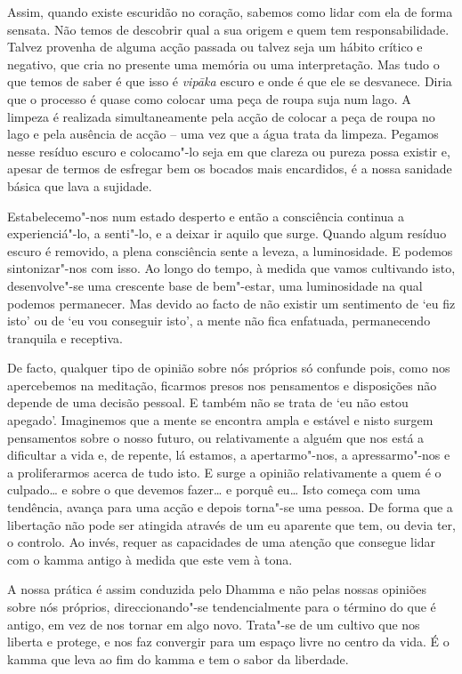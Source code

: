 Assim, quando existe escuridão no coração, sabemos como lidar com ela de forma
sensata. Não temos de descobrir qual a sua origem e quem tem responsabilidade.
Talvez provenha de alguma acção passada ou talvez seja um hábito crítico e
negativo, que cria no presente uma memória ou uma interpretação. Mas tudo o que
temos de saber é que isso é \emph{vipāka} escuro e onde é que ele se desvanece.
Diria que o processo é quase como colocar uma peça de roupa suja num lago. A
limpeza é realizada simultaneamente pela acção de colocar a peça de roupa no
lago e pela ausência de acção -- uma vez que a água trata da limpeza. Pegamos
nesse resíduo escuro e colocamo"-lo seja em que clareza ou pureza possa existir
e, apesar de termos de esfregar bem os bocados mais encardidos, é a nossa
sanidade básica que lava a sujidade.

Estabelecemo"-nos num estado desperto e então a consciência continua a
experienciá"-lo, a senti"-lo, e a deixar ir aquilo que surge. Quando algum resíduo
escuro é removido, a plena consciência sente a leveza, a luminosidade. E podemos
sintonizar"-nos com isso. Ao longo do tempo, à medida que vamos cultivando isto,
desenvolve"-se uma crescente base de bem"-estar, uma luminosidade na qual podemos
permanecer. Mas devido ao facto de não existir um sentimento de `eu fiz isto' ou
de `eu vou conseguir isto', a mente não fica enfatuada, permanecendo tranquila e
receptiva.

\enlargethispage{\baselineskip}

De facto, qualquer tipo de opinião sobre nós próprios só confunde pois, como nos
apercebemos na meditação, ficarmos presos nos pensamentos e disposições não
depende de uma decisão pessoal. E também não se trata de `eu não estou apegado'.
Imaginemos que a mente se encontra ampla e estável e nisto surgem pensamentos
sobre o nosso futuro, ou relativamente a alguém que nos está a dificultar a vida
e, de repente, lá estamos, a apertarmo"-nos, a apressarmo"-nos e a proliferarmos
acerca de tudo isto. E surge a opinião relativamente a quem é o culpado\ldots{}
e sobre o que devemos fazer\ldots{} e porquê eu\ldots{} Isto começa com uma
tendência, avança para uma acção e depois torna"-se uma pessoa. De forma que a
libertação não pode ser atingida através de um eu aparente que tem, ou devia
ter, o controlo. Ao invés, requer as capacidades de uma atenção que consegue
lidar com o kamma antigo à medida que este vem à tona.

A nossa prática é assim conduzida pelo Dhamma e não pelas nossas opiniões sobre
nós próprios, direccionando"-se tendencialmente para o término do que é antigo,
em vez de nos tornar em algo novo. Trata"-se de um cultivo que nos liberta e
protege, e nos faz convergir para um espaço livre no centro da vida. É o kamma
que leva ao fim do kamma e tem o sabor da liberdade.
